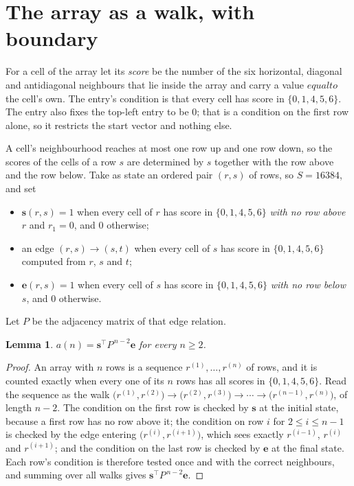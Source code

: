 \documentclass[11pt,a4paper]{article}
\theoremstyle{plain}
\newtheorem{lemma}[theorem]{Lemma}
\theoremstyle{definition}
\begin{document}
\section{The array as a walk, with boundary}

For a cell of the array let its \emph{score} be the number of the six horizontal, diagonal and antidiagonal neighbours that lie inside
the array and carry a value $equal to$ the cell's own. The entry's condition is that every cell
has score in $\{0,1,4,5,6\}$. The entry also fixes the top-left entry to be $0$; that is a condition on the first row alone, so it restricts the start vector and nothing else.

A cell's neighbourhood reaches at most one row up and one row down, so the scores of the
cells of a row $s$ are determined by $s$ together with the row above and the row below.
Take as state an ordered pair $(r,s)$ of rows, so $S=16384$, and set
\begin{itemize}
\item $\mathbf{s}(r,s)=1$ when every cell of $r$ has score in $\{0,1,4,5,6\}$ \emph{with no row
above $r$} and $r_1=0$, and $0$ otherwise;
\item an edge $(r,s)\to(s,t)$ when every cell of $s$ has score in $\{0,1,4,5,6\}$ computed from
$r$, $s$ and $t$;
\item $\mathbf{e}(r,s)=1$ when every cell of $s$ has score in $\{0,1,4,5,6\}$ \emph{with no row
below $s$}, and $0$ otherwise.
\end{itemize}
Let $P$ be the adjacency matrix of that edge relation.

\begin{lemma}\label{lem:walk}
$a(n)=\mathbf{s}^{\!\top}P^{\,n-2}\mathbf{e}$ for every $n\ge2$.
\end{lemma}

\begin{proof}
An array with $n$ rows is a sequence $r^{(1)},\dots,r^{(n)}$ of rows, and it is counted
exactly when every one of its $n$ rows has all scores in $\{0,1,4,5,6\}$. Read the sequence as the
walk $\bigl(r^{(1)},r^{(2)}\bigr)\to\bigl(r^{(2)},r^{(3)}\bigr)\to\cdots\to
\bigl(r^{(n-1)},r^{(n)}\bigr)$, of length $n-2$. The condition on the first row is
checked by $\mathbf{s}$ at the initial state, because a first row has no row above it; the
condition on row $i$ for $2\le i\le n-1$ is checked by the edge entering
$\bigl(r^{(i)},r^{(i+1)}\bigr)$, which sees exactly $r^{(i-1)}$, $r^{(i)}$ and
$r^{(i+1)}$; and the condition on the last row is checked by $\mathbf{e}$ at the final
state. Each row's condition is therefore tested once and with the correct neighbours, and
summing over all walks gives $\mathbf{s}^{\!\top}P^{\,n-2}\mathbf{e}$.
\end{proof}
\end{document}
